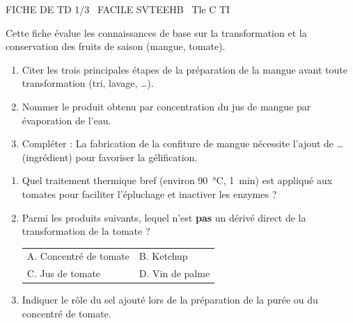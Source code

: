 \documentclass[11pt]{article}
\begin{document}
\begin{tcolorbox}[enhanced,colback=popink,colframe=popink,arc=10pt,boxrule=0pt,left=12pt,right=12pt,top=9pt,bottom=9pt]
{\color{white}\popxbold\small FICHE DE TD 1/3 \textbullet\ FACILE \hfill SVTEEHB \textbullet\ Tle C TI\par}
\end{tcolorbox}
\vspace{4pt}
Cette fiche évalue les connaissances de base sur la transformation et la conservation des fruits de saison (mangue, tomate).

\begin{exercice}
\begin{enumerate}
    \item Citer les trois principales étapes de la préparation de la mangue avant toute transformation (tri, lavage, \dots).
    \item Nommer le produit obtenu par concentration du jus de mangue par évaporation de l'eau.
    \item Compléter : La fabrication de la confiture de mangue nécessite l'ajout de \dots (ingrédient) pour favoriser la gélification.
\end{enumerate}
\end{exercice}

\begin{exercice}
\begin{enumerate}
    \item Quel traitement thermique bref (environ \SI{90}{\celsius}, \SI{1}{min}) est appliqué aux tomates pour faciliter l'épluchage et inactiver les enzymes ?
    \item Parmi les produits suivants, lequel n'est \textbf{pas} un dérivé direct de la transformation de la tomate ?\\
    \begin{tabular}{ll}
    A. Concentré de tomate & B. Ketchup \\
    C. Jus de tomate & D. Vin de palme
    \end{tabular}
    \item Indiquer le rôle du sel ajouté lors de la préparation de la purée ou du concentré de tomate.
\end{enumerate}
\end{exercice}
\end{document}
